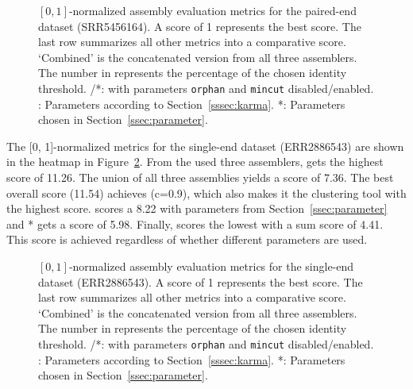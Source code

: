 \documentclass[12pt,a4paper,english]{article}
\begin{document}
	\begin{figure}[H]
		\hspace{-13pt}
		\def\svgwidth{1.1\textwidth}
		
		\caption[Normalized assembly evaluation metrics (\celegans, PE, SRR5456164).]{$[0,1]$-normalized assembly evaluation metrics for the paired-end \celegans dataset (SRR5456164). A score of 1 represents the best score. The last row summarizes all other metrics into a comparative score. `Combined' is the concatenated version from all three assemblers. The number in \cdhit represents the percentage of the chosen identity threshold. \grouper/\grouper{}*: \grouper with parameters \texttt{orphan} and \texttt{mincut} disabled/enabled. \karma: Parameters according to Section~\ref{sssec:karma}. \karma{}*: Parameters chosen in Section~\ref{ssec:parameter}. }
		\label{img:cel_pe}
	\end{figure}
	\newpage

	The [0, 1]-normalized metrics for the single-end \celegans dataset (ERR2886543) are shown in the heatmap in Figure~\ref{img:cel_se}.  From the used three assemblers, \spades gets the highest score of 11.26. The union of all three assemblies yields a score of 7.36. The best overall score (11.54) achieves \cdhit (c=0.9), which also makes it the clustering tool with the highest score. \karma scores a 8.22 with parameters from Section~\ref{ssec:parameter} and \karma{}* gets a score of 5.98.
	Finally, \grouper scores the lowest with a sum score of 4.41. This score is achieved regardless of whether different parameters are used.\\
	

	\begin{figure}[H]
		\hspace{-13pt}
		\def\svgwidth{1.1\textwidth}
		
		\caption[Normalized assembly evaluation metrics (\celegans, SE, ERR2886543).]{$[0,1]$-normalized assembly evaluation metrics for the single-end \celegans dataset (ERR2886543). A score of 1 represents the best score. The last row summarizes all other metrics into a comparative score. `Combined' is the concatenated version from all three assemblers. The number in \cdhit represents the percentage of the chosen identity threshold. \grouper/\grouper{}*: \grouper with parameters \texttt{orphan} and \texttt{mincut} disabled/enabled. \karma: Parameters according to Section~\ref{sssec:karma}. \karma{}*: Parameters chosen in Section~\ref{ssec:parameter}.}
		\label{img:cel_se}
	\end{figure}
\end{document}
